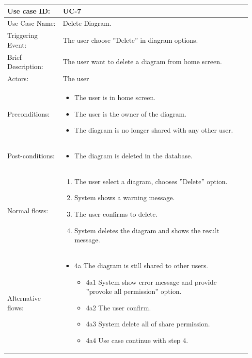 \begin{table}[]
\begin{tabular}{| m{4cm} | m{11cm} |}
\hline
Use case ID:       & UC-7 \\ \hline
Use Case Name:     & Delete Diagram. \\ \hline
Triggering Event:  & The user choose ''Delete'' in diagram options. \\ \hline
Brief Description: & The user want to delete a diagram from home screen. \\ \hline
Actors:            & The user \\ \hline
Preconditions:     & \begin{itemize}
    \item The user is in home screen.
    \item The user is the owner of the diagram.
    \item The diagram is no longer shared with any other user.
\end{itemize} \\ \hline
Post-conditions:   & \begin{itemize}
    \item The diagram is deleted in the database.
\end{itemize} \\ \hline
Normal flows:      & \begin{enumerate}
    \item The user select a diagram, chooses ''Delete'' option.
    \item System shows a warning message.
    \item The user confirms to delete.
    \item System deletes the diagram and shows the result message.
\end{enumerate} \\ \hline
Alternative flows: & \begin{itemize}
    \item {4a The diagram is still shared to other users.}
    \begin{itemize}
        \item 4a1 System show error message and provide ''provoke all permission'' option.
        \item 4a2 The user confirm.
        \item 4a3 System delete all of share permission.
        \item 4a4 Use case continue with step 4.
    \end{itemize}
\end{itemize} \\ \hline

\end{tabular}
\end{table}
